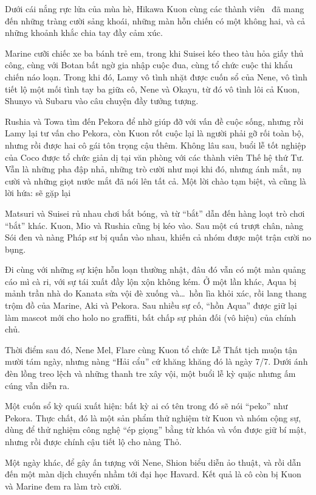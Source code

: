 \documentclass[main.tex]{subfiles}
\begin{document}
\color{black}

Dưới cái nắng rực lửa của mùa hè, Hikawa Kuon cùng các thành viên \hll\ đã mang đến những tràng cười sảng khoái, những màn hỗn chiến có một không hai, và cả những khoảnh khắc chia tay đầy cảm xúc.

Marine cưỡi chiếc xe ba bánh trẻ em, trong khi Suisei kéo theo tàu hỏa giấy thủ công, cùng với Botan bất ngờ gia nhập cuộc đua, cùng tổ chức cuộc thi khẩu chiến náo loạn. Trong khi đó, Lamy vô tình nhặt được cuốn sổ của Nene, vô tình tiết lộ một mối tình tay ba giữa cô, Nene và Okayu, từ đó vô tình lôi cả Kuon, Shunyo và Subaru vào câu chuyện đầy tưởng tượng.

Rushia và Towa tìm đến Pekora để nhờ giúp đỡ với vấn đề cuộc sống, nhưng rồi Lamy lại tư vấn cho Pekora, còn Kuon rốt cuộc lại là người phải gỡ rối toàn bộ, nhưng rồi được hai cô gái tôn trọng cậu thêm. Không lâu sau, buổi lễ tốt nghiệp của Coco được tổ chức giản dị tại văn phòng với các thành viên Thế hệ thứ Tư. Vẫn là những pha đập nhả, những trò cười như mọi khi đó, nhưng ánh mắt, nụ cười và những giọt nước mắt đã nói lên tất cả. Một lời chào tạm biệt, và cũng là lời hứa: sẽ gặp lại

Matsuri và Suisei rủ nhau chơi bắt bóng, và từ ``bắt'' dẫn đến hàng loạt trò chơi ``bắt'' khác. Kuon, Mio và Rushia cũng bị kéo vào. Sau một cú trượt chân, nàng Sói đen và nàng Pháp sư bị quấn vào nhau, khiến cả nhóm được một trận cười no bụng.

Đi cùng với những sự kiện hỗn loạn thường nhật, đâu đó vẫn có một màn quảng cáo mì cà ri, với sự tái xuất đầy lộn xộn không kém. Ở một lần khác, Aqua bị mảnh trần nhà do Kanata sửa vội đè xuống và\dots\ hồn lìa khỏi xác, rồi lang thang trộm đồ của Marine, Aki và Pekora. Sau nhiều sự cố, ``hồn Aqua'' được giữ lại làm mascot mới cho holo no graffiti, bất chấp sự phản đối (vô hiệu) của chính chủ.

Thời điểm sau đó, Nene Mel, Flare cùng Kuon tổ chức Lễ Thất tịch muộn tận mười tám ngày, nhưng nàng ``Hải cẩu'' cứ khăng khăng đó là ngày 7/7. Dưới ánh đèn lồng treo lệch và những thanh tre xây vội, một buổi lễ kỳ quặc nhưng ấm cúng vẫn diễn ra.

Một cuốn sổ kỳ quái xuất hiện: bất kỳ ai có tên trong đó sẽ nói ``peko'' như Pekora. Thực chất, đó là một sản phẩm thử nghiệm từ Kuon và nhóm cộng sự, dùng để thử nghiệm công nghệ ``ép giọng'' bằng từ khóa và vốn được giữ bí mật, nhưng rồi được chính cậu tiết lộ cho nàng Thỏ.

Một ngày khác, để gây ấn tượng với Nene, Shion biểu diễn ảo thuật, và rồi dẫn đến một màn dịch chuyển nhầm tới đại học Havard. Kết quả là cô còn bị Kuon và Marine đem ra làm trò cười.
\end{document}
